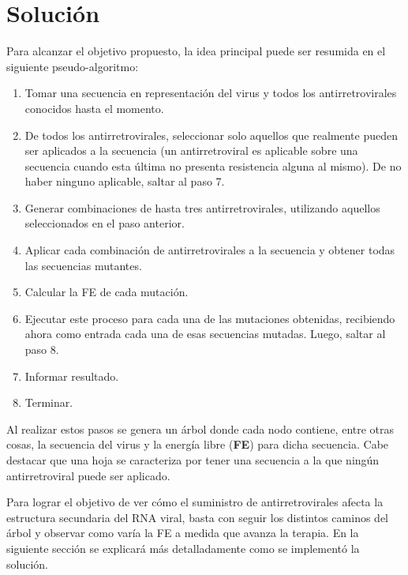 \section{Soluci\'on}
Para alcanzar el objetivo propuesto, la idea principal puede ser resumida en el siguiente pseudo-algoritmo:
\begin{enumerate}
 \item Tomar una secuencia en representaci\'on del virus y todos los antirretrovirales conocidos hasta el momento.
 \item De todos los antirretrovirales, seleccionar solo aquellos que realmente pueden ser aplicados a la secuencia (un antirretroviral es aplicable
       sobre una secuencia cuando esta \'ultima no presenta resistencia alguna al mismo). De no haber ninguno aplicable, saltar al paso 7.
 \item Generar combinaciones de hasta tres antirretrovirales, utilizando aquellos seleccionados en el paso anterior.
 \item Aplicar cada combinaci\'on de antirretrovirales a la secuencia y obtener todas las secuencias mutantes.
 \item Calcular la FE de cada mutaci\'on.
 \item Ejecutar este proceso para cada una de las mutaciones obtenidas, recibiendo ahora como entrada cada una de esas secuencias mutadas. 
       Luego, saltar al paso 8.
 \item Informar resultado.
 \item Terminar.
\end{enumerate}
Al realizar estos pasos se genera un \'arbol donde cada nodo contiene, entre otras cosas, la secuencia del virus y la energ\'ia libre
(\textbf{FE}) para dicha secuencia. Cabe destacar que una hoja se caracteriza por tener una secuencia a la que ning\'un antirretroviral puede ser aplicado.

Para lograr el objetivo de ver c\'omo el suministro de antirretrovirales afecta la estructura secundaria del RNA viral, basta con seguir los distintos
caminos del \'arbol y observar como var\'ia la FE a medida que avanza la terapia. En la siguiente secci\'on se explicar\'a m\'as detalladamente como
se implement\'o la soluci\'on.

